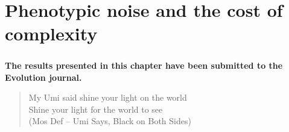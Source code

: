 

\chapter{Phenotypic noise and the cost of complexity}
\label{ch:part1:sigmaFGM}

\paragraph{}
\paragraph{}
\paragraph{}
\paragraph{}
\paragraph{}
\paragraph{}
\paragraph{}
\paragraph{}
\begin{center}
\large \textbf{The results presented in this chapter have been submitted to the Evolution journal.}
\end{center}

\newpage

\begin{quote}
My Umi said shine your light on the world\\
Shine your light for the world to see\\
(Mos Def -- Umi Says, Black on Both Sides)
\end{quote}

